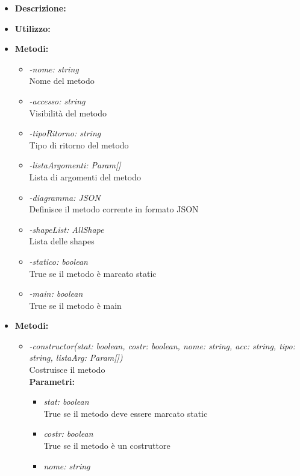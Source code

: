\begin{itemize}
	\item \textbf{Descrizione:}\\
	
	\item \textbf{Utilizzo:}\\
	
	\item \textbf{Metodi:}
		\begin{itemize}
			\item \emph{-nome: string}\\
    		Nome del metodo
    		\item \emph{-accesso: string}\\
    		Visibilità del metodo
    		\item \emph{-tipoRitorno: string}\\
    		Tipo di ritorno del metodo
    		\item \emph{-listaArgomenti: Param[]}\\
    		Lista di argomenti del metodo
    		\item \emph{-diagramma: JSON}\\
    		Definisce il metodo corrente in formato JSON
    		\item \emph{-shapeList: AllShape}\\
    		Lista delle shapes
    		\item \emph{-statico: boolean}\\
    		True se il metodo è marcato static
    		\item \emph{-main: boolean}\\
    		True se il metodo è main
		\end{itemize}
	\item \textbf{Metodi:}
		\begin{itemize}
			\item \emph{-constructor(stat: boolean, costr: boolean, nome: string, acc: string, tipo: string, listaArg: Param[])}\\
    		Costruisce il metodo\\
    		\textbf{Parametri:}
    		\begin{itemize}
    			\item \emph{stat: boolean}\\
    			True se il metodo deve essere marcato static
    			\item \emph{costr: boolean}\\
    			True se il metodo è un costruttore
    			\item \emph{nome: string}\\

\end{itemize}
\end{itemize}
\end{itemize}
